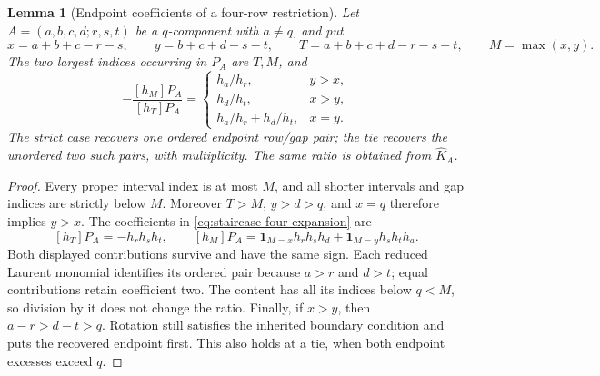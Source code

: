 \documentclass[11pt,a4paper]{amsart}
\numberwithin{equation}{section}
\theoremstyle{plain}
\newtheorem{lemma}[theorem]{Lemma}
\theoremstyle{definition}
\begin{document}
\begin{lemma}[Endpoint coefficients of a four-row restriction]
\label{lem:staircase-endpoint-coefficients}
Let \(A=(a,b,c,d;r,s,t)\) be a \(q\)-component with \(a\ne q\),
and put
\[
 x=a+b+c-r-s,\qquad y=b+c+d-s-t,\qquad
 T=a+b+c+d-r-s-t,\qquad M=\max(x,y).
\]
The two largest indices occurring in \(P_A\) are \(T,M\), and
\[
 -\frac{[h_M]P_A}{[h_T]P_A}
 =\begin{cases}
 h_a/h_r,&y>x,\\
 h_d/h_t,&x>y,\\
 h_a/h_r+h_d/h_t,&x=y.
 \end{cases}
\]
The strict case recovers one ordered endpoint row/gap pair; the tie
recovers the unordered two such pairs, with multiplicity.  The same
ratio is obtained from \(\widehat K_A\).
\end{lemma}

\begin{proof}
Every proper interval index is at most \(M\), and all shorter
intervals and gap indices are strictly below \(M\).
Moreover \(T>M\), \(y>d>q\), and \(x=q\) therefore implies
\(y>x\).  The coefficients in
\eqref{eq:staircase-four-expansion} are
\[
 [h_T]P_A=-h_rh_sh_t,\qquad
 [h_M]P_A=
 \mathbf1_{M=x}h_rh_sh_d+\mathbf1_{M=y}h_sh_th_a.
\]
Both displayed contributions survive and have the same sign.
Each reduced Laurent monomial identifies its ordered pair because
\(a>r\) and \(d>t\); equal contributions retain coefficient two.
The content has all its indices below \(q<M\), so division by it
does not change the ratio.  Finally, if \(x>y\), then
\(a-r>d-t>q\).  Rotation still satisfies the inherited boundary
condition and puts the recovered endpoint first.  This also holds at
a tie, when both endpoint excesses exceed \(q\).
\end{proof}
\end{document}
